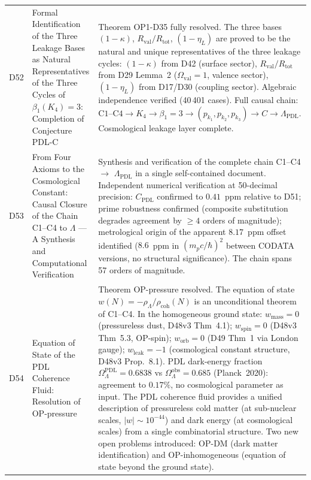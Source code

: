\documentclass[11pt,a4paper]{article}
\newcommand{\Rval}{R_{\mathrm{val}}}
\theoremstyle{plain}
\theoremstyle{definition}
\theoremstyle{remark}
\newcommand{\Rtot}{R_{\mathrm{tot}}}
\newcommand{\rhocoh}{\rho_{\mathrm{coh}}}
\begin{document}
\begin{longtable}{L{1.3cm}L{3.8cm}L{8.0cm}}
D52 & Formal Identification of the Three Leakage Bases as Natural Representatives of the Three Cycles of $\beta_1(K_4)=3$: Completion of Conjecture PDL-C~\cite{D52} & \textcolor{proofblue}{Theorem} OP1-D35 fully resolved. The three bases $(1-\kappa)$, $\Rval/\Rtot$, $(1-\eta_L)$ are proved to be the natural and unique representatives of the three leakage cycles: $(1-\kappa)$ from D42 (surface sector), $\Rval/\Rtot$ from D29 Lemma~2 ($\Omega_{\mathrm{val}}=1$, valence sector), $(1-\eta_L)$ from D17/D30 (coupling sector). Algebraic independence verified (40\,401 cases). Full causal chain: $\mathrm{C1}\text{--}\mathrm{C4} \to K_4 \to \beta_1=3 \to (p_{k_1},p_{k_2},p_{k_3}) \to C \to \Lambda_{\mathrm{PDL}}$. Cosmological leakage layer complete.\\[0.4em]
D53 & From Four Axioms to the Cosmological Constant: Causal Closure of the Chain C1--C4 to $\Lambda$ --- A Synthesis and Computational Verification~\cite{D53} & \textcolor{proofblue}{Synthesis and verification} of the complete chain C1--C4 $\to$ $\Lambda_{\mathrm{PDL}}$ in a single self-contained document. Independent numerical verification at 50-decimal precision: $C_{\mathrm{PDL}}$ confirmed to $0.41$~ppm relative to D51; prime robustness confirmed (composite substitution degrades agreement by $\geq 4$ orders of magnitude); metrological origin of the apparent $8.17$~ppm offset identified ($8.6$~ppm in $(m_p c/\hbar)^2$ between CODATA versions, no structural significance). The chain spans 57 orders of magnitude.\\[0.4em]
D54 & Equation of State of the PDL Coherence Fluid: Resolution of OP-pressure~\cite{D54} & \textcolor{proofblue}{Theorem} OP-pressure resolved. The equation of state $w(N) = -\rho_\Lambda/\rhocoh(N)$ is an unconditional theorem of C1--C4. In the homogeneous ground state: $w_{\mathrm{mass}} = 0$ (pressureless dust, D48v3 Thm~4.1); $w_{\mathrm{spin}} = 0$ (D48v3 Thm~5.3, OP-spin); $w_{\mathrm{orb}} = 0$ (D49 Thm~1 via London gauge); $w_{\mathrm{leak}} = -1$ (cosmological constant structure, D48v3 Prop.~8.1). PDL dark-energy fraction $\Omega_\Lambda^{\mathrm{PDL}} = 0.6838$ vs $\Omega_\Lambda^{\mathrm{obs}} = 0.685$ (Planck~2020): agreement to $0.17\%$, no cosmological parameter as input. The PDL coherence fluid provides a unified description of pressureless cold matter (at sub-nuclear scales, $|w|\sim 10^{-44}$) and dark energy (at cosmological scales) from a single combinatorial structure. Two new open problems introduced: OP-DM (dark matter identification) and OP-inhomogeneous (equation of state beyond the ground state).\\[0.4em]

\end{longtable}
\end{document}
